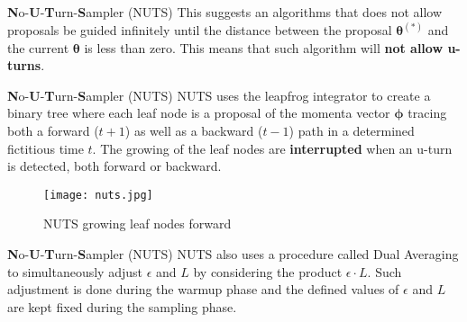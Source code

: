 \begin{frame}{\textbf{N}o-\textbf{U}-\textbf{T}urn-\textbf{S}ampler (NUTS)}
	This suggests an algorithms that does not allow proposals be guided infinitely
	until the distance between the proposal $\boldsymbol{\theta}^{(*)}$ and the current
	$\boldsymbol{\theta}$ is less than zero.
	\vfill
	This means that such algorithm will \textbf{not allow u-turns}.
\end{frame}

\begin{frame}{\textbf{N}o-\textbf{U}-\textbf{T}urn-\textbf{S}ampler (NUTS)}
	NUTS uses the leapfrog integrator to create a binary tree where each leaf node
	is a proposal of the momenta vector $\boldsymbol{\phi}$ tracing both a forward
	($t+1$) as well as a backward ($t-1$) path in a determined fictitious time $t$.
	The growing of the leaf nodes are \textbf{interrupted} when an u-turn is detected,
	both forward or backward.
	\begin{figure}
		\centering
		\texttt{[image: nuts.jpg]}
		\caption{NUTS growing leaf nodes forward}
	\end{figure}
\end{frame}

\begin{frame}{\textbf{N}o-\textbf{U}-\textbf{T}urn-\textbf{S}ampler (NUTS)}
	NUTS also uses a procedure called Dual Averaging
	\parencite{nesterov2009primal} to simultaneously adjust $\epsilon$ and $L$
	by considering the product $\epsilon \cdot L$.
	\vfill
	Such adjustment is done during the warmup phase and the defined values of
	$\epsilon$ and $L$ are kept fixed during the sampling phase.
\end{frame}

